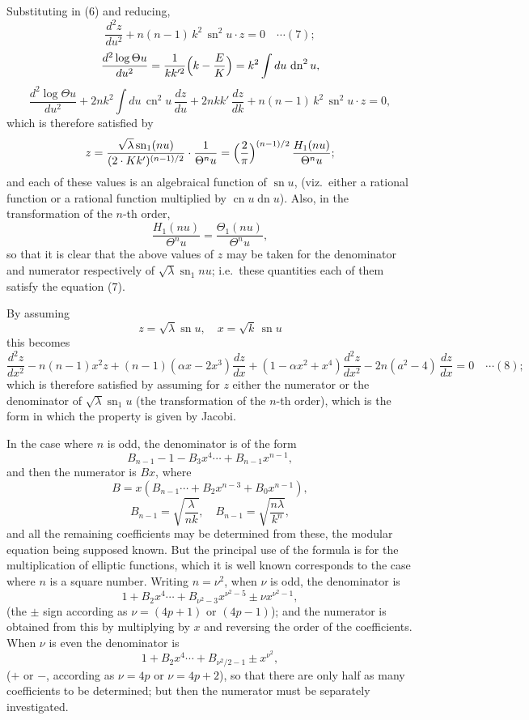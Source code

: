 \documentclass[12pt,a4paper]{article}
\begin{document}
Substituting in (6) and reducing,
\[
\frac{d^2z}{du^2} + n(n-1)\,k^2\,\operatorname{sn}^2 u\cdot z = 0 \quad\cdots(7);
\]
\[
\frac{d^2\log\Theta u}{du^2} = \frac{1}{k k'^2}\Bigl(k - \frac{E}{K}\Bigr) = k^2\int du\,\operatorname{dn}^2 u,
\]
\[
\frac{d^2\log\Theta u}{du^2} + 2nk^2 \int du\,\operatorname{cn}^2 u\,\frac{d z}{du} + 2n k k'\,\frac{dz}{dk} + n(n-1)\,k^2\,\operatorname{sn}^2 u \cdot z = 0,
\]
which is therefore satisfied by
\[
z = \frac{\sqrt{\lambda}\operatorname{sn}_1(nu)}{(2 \cdot K k')^{(n-1)/2}}\cdot\frac{1}{\Theta^n u} = \Bigl(\frac{2}{\pi}\Bigr)^{(n-1)/2}\,\frac{H_1(nu)}{\Theta^n u};
\]
and each of these values is an algebraical function of $\operatorname{sn} u$, (viz.\ either a rational function or a rational function multiplied by $\operatorname{cn} u\operatorname{dn} u$). Also, in the transformation of the $n$-th order,
\[
\frac{H_1(nu)}{\Theta^n u} = \frac{\Theta_1(nu)}{\Theta^n u},
\]
so that it is clear that the above values of $z$ may be taken for the denominator and numerator respectively of $\sqrt{\lambda}\operatorname{sn}_1 nu$; i.e.\ these quantities each of them satisfy the equation (7).

By assuming
\[
z = \sqrt{\lambda}\operatorname{sn} u,\quad x = \sqrt{k}\,\operatorname{sn} u
\]
this becomes
\[
\frac{d^2z}{dx^2} - n(n-1)x^2 z + (n-1)(\alpha x - 2x^3)\frac{dz}{dx} + (1 - \alpha x^2 + x^4)\frac{d^2 z}{dx^2} - 2n(a^2 - 4)\,\frac{dz}{dx} = 0 \quad\cdots(8);
\]
which is therefore satisfied by assuming for $z$ either the numerator or the denominator of $\sqrt{\lambda}\operatorname{sn}_1 u$ (the transformation of the $n$-th order), which is the form in which the property is given by Jacobi.

In the case where $n$ is odd, the denominator is of the form
\[
B_{n-1} - 1 - B_3 x^4 \cdots + B_{n-1} x^{n-1},
\]
and then the numerator is $Bx$,
where
\[
B = x(B_{n-1} \cdots + B_2 x^{n-3} + B_0 x^{n-1}),
\]
\[
B_{n-1} = \sqrt{\frac{\lambda}{nk}},\quad B_{n-1} = \sqrt{\frac{n\lambda}{k^n}},
\]
and all the remaining coefficients may be determined from these, the modular equation being supposed known. But the principal use of the formula is for the multiplication of elliptic functions, which it is well known corresponds to the case where $n$ is a square number. Writing $n = \nu^2$, when $\nu$ is odd, the denominator is
\[
1 + B_2 x^4 \cdots + B_{\nu^2 - 3} x^{\nu^2 - 5} \pm \nu x^{\nu^2 - 1},
\]
(the $\pm$ sign according as $\nu = (4p + 1)$ or $(4p - 1)$); and the numerator is obtained from this by multiplying by $x$ and reversing the order of the coefficients. When $\nu$ is even the denominator is
\[
1 + B_2 x^4 \cdots + B_{\nu^2 / 2 - 1} \pm x^{\nu^2},
\]
($+$ or $-$, according as $\nu = 4p$ or $\nu = 4p + 2$), so that there are only half as many coefficients to be determined; but then the numerator must be separately investigated.
\end{document}
